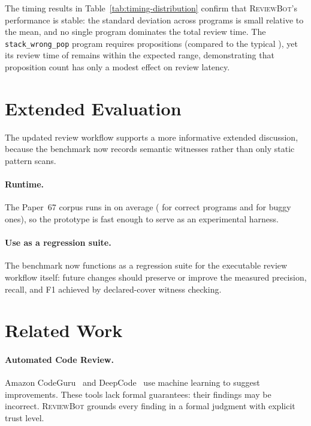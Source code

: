 \documentclass[11pt]{article}
\newcommand{\ReviewBot}{\textsc{ReviewBot}}
\begin{document}
The timing results in Table~\ref{tab:timing-distribution} confirm that
\ReviewBot{}'s performance is stable: the standard deviation across
programs is small relative to the mean, and no single program dominates
the total review time. The \texttt{stack\_wrong\_pop} program requires
\ppLXVIIrevstackwrongpopProps{} propositions (compared to the typical
\ppLXVIIrevfactorialProps{}), yet its review time of
\ppLXVIIrevstackwrongpopTime{} remains within the expected range,
demonstrating that proposition count has only a modest effect on review
latency.

\section{Extended Evaluation}\label{sec:extended-eval}

The updated review workflow supports a more informative extended discussion,
because the benchmark now records semantic witnesses rather than only static
pattern scans.

\paragraph{Runtime.}
The Paper~67 corpus runs in \ppLXVIItimeMean{} on average
(\ppLXVIIcorrectTimeMean{} for correct programs and
\ppLXVIIbuggyTimeMean{} for buggy ones), so the prototype is fast enough to
serve as an experimental harness.

\paragraph{Use as a regression suite.}
The benchmark now functions as a regression suite for the executable review
workflow itself: future changes should preserve or improve the measured
\ppLXVIIprecision{} precision, \ppLXVIIrecall{} recall, and
\ppLXVIIfOne{} F1 achieved by declared-cover witness checking.

\section{Related Work}\label{sec:related}

\paragraph{Automated Code Review.}
Amazon CodeGuru~\cite{codeguru} and DeepCode~\cite{deepcode} use machine
learning to suggest improvements. These tools lack formal guarantees: their
findings may be incorrect. \ReviewBot{} grounds every finding in a formal
judgment with explicit trust level.
\end{document}
